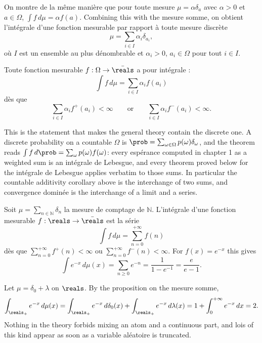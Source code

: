 On montre de la même manière que pour toute mesure $\mu = \alpha \delta_{a}$ avec
$\alpha > 0$ et $a \in \Omega$, $\int f \, d\mu = \alpha f(a)$. Combining this with
the mesure somme, on obtient l'intégrale d'une fonction mesurable par rapport à toute
mesure discrète
\[
  \mu = \sum_{i \in I} \alpha_{i} \delta_{a_{i}} ,
\]
où $I$ est un ensemble au plus dénombrable et $\alpha_{i} > 0$, $a_{i} \in \Omega$
pour tout $i \in I$.

\begin{theorem}
  Toute fonction mesurable $f : \Omega \to \bar{\reals}$ a pour intégrale :
  \[
    \int f \, d\mu = \sum_{i \in I} \alpha_{i} f(a_{i})
  \]
  dès que
  \[
    \sum_{i \in I} \alpha_{i} f^{+}(a_{i}) < \infty
    \qquad \text{or} \qquad
    \sum_{i \in I} \alpha_{i} f^{-}(a_{i}) < \infty .
  \]
\end{theorem}

\begin{remark}
  This is the statement that makes the general theory contain the discrete one. A
  discrete probability on a countable $\Omega$ is $\prob = \sum_{\omega \in \Omega}
  p(\omega) \delta_{\omega}$, and the theorem reads $\int f \, d\prob = \sum_{\omega}
  p(\omega) f(\omega)$: every espérance computed in chapter 1 as a weighted sum is
  an intégrale de Lebesgue, and every theorem proved below for the intégrale de
  Lebesgue applies verbatim to those sums. In particular the countable additivity
  corollary above is the interchange of two sums, and convergence dominée is the
  interchange of a limit and a series.
\end{remark}

\begin{example}
  Soit $\mu = \sum_{n \in \mathbb{N}} \delta_{n}$ la mesure de comptage de
  $\mathbb{N}$. L'intégrale d'une fonction mesurable $f : \reals \to \bar{\reals}$
  est la série
  \[
    \int f \, d\mu = \sum_{n=0}^{+\infty} f(n)
  \]
  dès que $\sum_{n=0}^{+\infty} f^{+}(n) < \infty$ ou $\sum_{n=0}^{+\infty}
  f^{-}(n) < \infty$. For $f(x) = e^{-x}$ this gives
  \[
    \int e^{-x} \, d\mu(x) = \sum_{n \geq 0} e^{-n} = \frac{1}{1 - e^{-1}}
    = \frac{e}{e-1} .
  \]
\end{example}

\begin{example}
  Let $\mu = \delta_{0} + \lambda$ on $\reals$. By the proposition on the mesure
  somme,
  \[
    \int_{\reals_{+}} e^{-x} \, d\mu(x)
    = \int_{\reals_{+}} e^{-x} \, d\delta_{0}(x)
      + \int_{\reals_{+}} e^{-x} \, d\lambda(x)
    = 1 + \int_{0}^{+\infty} e^{-x} \, dx = 2 .
  \]
  Nothing in the theory forbids mixing an atom and a continuous part, and lois of
  this kind appear as soon as a variable aléatoire is truncated.
\end{example}


